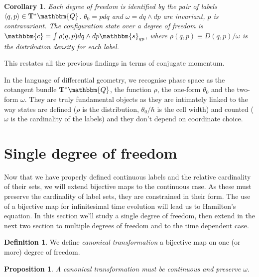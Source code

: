 \documentclass[aps,pra,10pt,twocolumn,floatfix,nofootinbib]{revtex4-1}
\newtheorem{cor}[thm]{Corollary}
\newtheorem{prop}[thm]{Proposition}
\theoremstyle{definition}
\newtheorem{defn}[thm]{Definition}
\begin{document}
\begin{cor}\label{continuousConjugateRelationships}
Each degree of freedom is identified by the pair of labels $\langle q,p \rangle \in \mathbf{T}^*\mathbbm{Q}$. $\theta_0 = p dq$ and $\omega = dq \wedge dp$ are invariant, $p$ is contravariant. The configuration state over a degree of freedom is $\mathbbm{c}=\int \rho(q,p) dq \wedge dp \mathbbm{s}_{qp}$, where $\rho(q,p)\equiv D(q,p) / \omega$ is the distribution density for each label.
\end{cor}

This restates all the previous findings in terms of conjugate momentum.

In the language of differential geometry, we recognise phase space as the cotangent bundle $\mathbf{T}^*\mathbbm{Q}$, the function $\rho$, the one-form $\theta_0$ and the two-form $\omega$. They are truly fundamental objects as they are intimately linked to the way states are defined ($\rho$ is the distribution, $\theta_0 / \hbar$ is the cell width) and counted ($\omega$ is the cardinality of the labels) and they don't depend on coordinate choice.

\section{Single degree of freedom}

Now that we have properly defined continuous labels and the relative cardinality of their sets, we will extend bijective maps to the continuous case. As these must preserve the cardinality of label sets, they are constrained in their form. The use of a bijective map for infinitesimal time evolution will lead us to Hamilton's equation. In this section we'll study a single degree of freedom, then extend in the next two section to multiple degrees of freedom and to the time dependent case.

\begin{defn}\label{canonical}
We define \emph{canonical transformation} a bijective map on one (or more) degree of freedom.
\end{defn}

\begin{prop}\label{continuousMapping}
A canonical transformation must be continuous and preserve $\omega$.
\end{prop}
\end{document}
